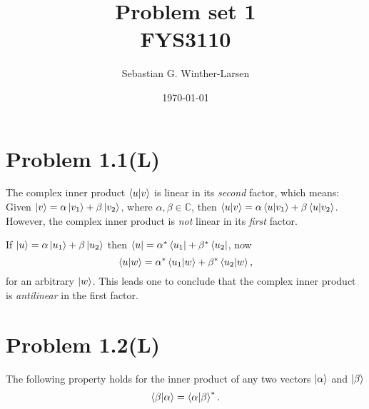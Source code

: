 \documentclass[11pt]{article}
\title{Problem set 1 \\ \large{FYS3110}}
\author{Sebastian G. Winther-Larsen}
\date{\today}
\begin{document}
\maketitle

\section*{Problem 1.1(L)}

The complex inner product $\braket{u}{v}$ is linear in its \emph{second} factor, which means: Given $\ket{v} = \alpha\ket{v_1} + \beta\ket{v_2}$, where $\alpha, \beta \in \mathbb{C}$, then $\braket{u}{v} = \alpha\braket{u}{v_1} + \beta\braket{u}{v_2}$. However, the complex inner product is \emph{not} linear in its \emph{first} factor.

If $\ket{u} = \alpha\ket{u_1} + \beta\ket{u_2}$ then $\bra{u} = \alpha^*\bra{u_1} + \beta^*\bra{u_2}$, now
\begin{equation}
\braket{u}{w} = \alpha^*\braket{u_1}{w} +  \beta^*\braket{u_2}{w},
\end{equation}
for an arbitrary $\ket{w}$. This leads one to conclude that the complex inner product is \emph{antilinear} in the first factor.

\section*{Problem 1.2(L)}

The following property holds for the inner product of any two vectors $\ket{\alpha}$ and $\ket{\beta}$
\begin{equation}
\braket{\beta}{\alpha} = \braket{\alpha}{\beta}^*.
\end{equation}
\end{document}
